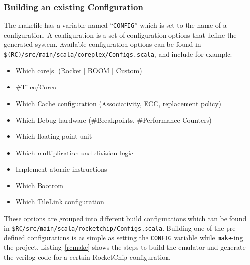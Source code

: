 \documentclass[journal,a4paper]{IEEEtran}
\begin{document}
\subsubsection{Building an existing Configuration}
The makefile has a variable named ``\texttt{CONFIG}'' which is set to the name of a configuration.
A configuration is a set of configuration options that define the generated system.
Available configuration options can be found in \texttt{\$(RC)/src/main/scala/coreplex/Configs.scala}, and include for example:

\begin{itemize}
	\item Which core[s] (Rocket | BOOM | Custom)
	\item \#Tiles/Cores
	\item Which Cache configuration (Associativity, ECC, replacement policy)
	\item Which Debug hardware (\#Breakpoints, \#Performance Counters)
	\item Which floating point unit
	\item Which multiplication and division logic
	\item Implement atomic instructions
	\item Which Bootrom
	\item Which TileLink configuration
\end{itemize}
These options are grouped into different build configurations which can be found in \texttt{\$RC/src/main/scala/rocketchip/Configs.scala}.
Building one of the pre-defined configurations is as simple as setting the \texttt{CONFIG} variable while \texttt{make}-ing the project.
Listing~\ref{rcmake} shows the steps to build the emulator and generate the verilog code for a certain RocketChip configuration.
\end{document}
